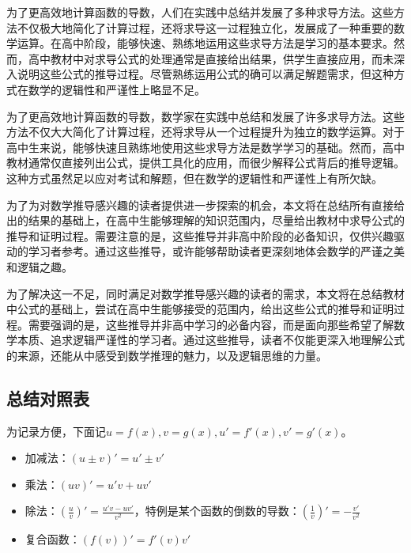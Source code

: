 
\begin{issues}
\issueDraft
\end{issues}


为了更高效地计算函数的导数，人们在实践中总结并发展了多种求导方法。这些方法不仅极大地简化了计算过程，还将求导这一过程独立化，发展成了一种重要的数学运算。在高中阶段，能够快速、熟练地运用这些求导方法是学习的基本要求。然而，高中教材中对求导公式的处理通常是直接给出结果，供学生直接应用，而未深入说明这些公式的推导过程。尽管熟练运用公式的确可以满足解题需求，但这种方式在数学的逻辑性和严谨性上略显不足。

为了更高效地计算函数的导数，数学家在实践中总结和发展了许多求导方法。这些方法不仅大大简化了计算过程，还将求导从一个过程提升为独立的数学运算。对于高中生来说，能够快速且熟练地使用这些求导方法是数学学习的基础。然而，高中教材通常仅直接列出公式，提供工具化的应用，而很少解释公式背后的推导逻辑。这种方式虽然足以应对考试和解题，但在数学的逻辑性和严谨性上有所欠缺。

为了为对数学推导感兴趣的读者提供进一步探索的机会，本文将在总结所有直接给出的结果的基础上，在高中生能够理解的知识范围内，尽量给出教材中求导公式的推导和证明过程。需要注意的是，这些推导并非高中阶段的必备知识，仅供兴趣驱动的学习者参考。通过这些推导，或许能够帮助读者更深刻地体会数学的严谨之美和逻辑之趣。




为了解决这一不足，同时满足对数学推导感兴趣的读者的需求，本文将在总结教材中公式的基础上，尝试在高中生能够接受的范围内，给出这些公式的推导和证明过程。需要强调的是，这些推导并非高中学习的必备内容，而是面向那些希望了解数学本质、追求逻辑严谨性的学习者。通过这些推导，读者不仅能更深入地理解公式的来源，还能从中感受到数学推理的魅力，以及逻辑思维的力量。

\subsection{总结对照表}

为记录方便，下面记$u=f(x),v=g(x),u'=f'(x),v'=g'(x)$。

\begin{itemize}
\item 加减法：$(u\pm v)'=u'\pm v'$
\item 乘法：$(uv)'=u'v+uv'$
\item 除法：$\displaystyle\left(\frac{u}{v}\right)'=\frac{u'v-uv'}{v^2}$，特例是某个函数的倒数的导数：$\displaystyle\left(\frac{1}{v}\right)'=-\frac{v'}{v^2}$
\item 复合函数：$(f(v))'=f'(v)v'$
\end{itemize}

